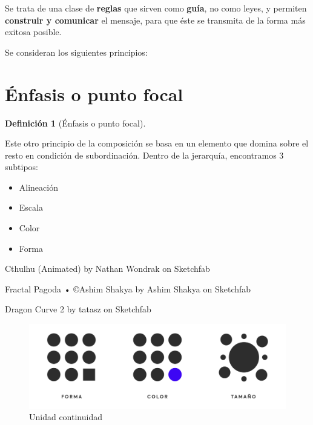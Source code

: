 \documentclass[
  16pt,
]{krantz}
\providecommand{\tightlist}{%
  \setlength{\itemsep}{0pt}\setlength{\parskip}{0pt}}
\theoremstyle{definition}
\newtheorem{definition}{Definición}[chapter]
\theoremstyle{definition}
\theoremstyle{definition}
\theoremstyle{definition}
\theoremstyle{remark}
\begin{document}
Se trata de una clase de \textbf{reglas} que sirven como \textbf{guía}, no como leyes, y permiten \textbf{construir y comunicar} el mensaje, para que éste se transmita de la forma más exitosa posible.

Se consideran los siguientes principios:

\hypertarget{uxe9nfasis-o-punto-focal}{%
\section{Énfasis o punto focal}\label{uxe9nfasis-o-punto-focal}}

\begin{definition}[Énfasis o punto focal]
\protect\hypertarget{def:www}{}\label{def:www}

Este otro principio de la composición se basa en un elemento que domina sobre el resto en condición de subordinación. Dentro de la jerarquía, encontramos 3 subtipos:

\begin{itemize}
\tightlist
\item
  Alineación
\item
  Escala
\item
  Color
\item
  Forma
\end{itemize}

\end{definition}

Cthulhu (Animated) by Nathan Wondrak on Sketchfab

Fractal Pagoda • ©Ashim Shakya by Ashim Shakya on Sketchfab

Dragon Curve 2 by tatasz on Sketchfab

\begin{figure}

{\centering \includegraphics[width=1\linewidth,height=1\textheight]{enfasis} 

}

\caption{Unidad continuidad}\label{fig:enfasisw}
\end{figure}
\end{document}
